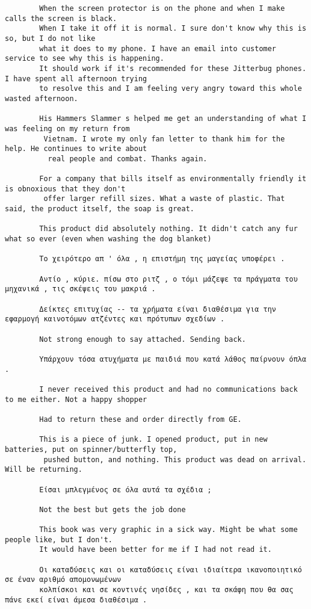 \documentclass[11pt, a4paper]{article}
\begin{document}
\begin{verbatim}
		When the screen protector is on the phone and when I make calls the screen is black. 
		When I take it off it is normal. I sure don't know why this is so, but I do not like 
		what it does to my phone. I have an email into customer service to see why this is happening. 
		It should work if it's recommended for these Jitterbug phones. I have spent all afternoon trying 
		to resolve this and I am feeling very angry toward this whole wasted afternoon.
		
		His Hammers Slammer s helped me get an understanding of what I was feeling on my return from
		 Vietnam. I wrote my only fan letter to thank him for the help. He continues to write about
		  real people and combat. Thanks again.
		
		For a company that bills itself as environmentally friendly it is obnoxious that they don't
		 offer larger refill sizes. What a waste of plastic. That said, the product itself, the soap is great.
		
		This product did absolutely nothing. It didn't catch any fur what so ever (even when washing the dog blanket)
		
		Το χειρότερο απ ' όλα , η επιστήμη της μαγείας υποφέρει .
		
		Αντίο , κύριε. πίσω στο ριτζ , ο τόμι μάζεψε τα πράγματα του μηχανικά , τις σκέψεις του μακριά .
		
		Δείκτες επιτυχίας -- τα χρήματα είναι διαθέσιμα για την εφαρμογή καινοτόμων ατζέντες και πρότυπων σχεδίων .
		
		Not strong enough to say attached. Sending back.
		
		Υπάρχουν τόσα ατυχήματα με παιδιά που κατά λάθος παίρνουν όπλα .
		
		I never received this product and had no communications back to me either. Not a happy shopper
		
		Had to return these and order directly from GE.
		
		This is a piece of junk. I opened product, put in new batteries, put on spinner/butterfly top,
		 pushed button, and nothing. This product was dead on arrival. Will be returning.
		
		Είσαι μπλεγμένος σε όλα αυτά τα σχέδια ;
		
		Not the best but gets the job done
		
		This book was very graphic in a sick way. Might be what some people like, but I don't. 
		It would have been better for me if I had not read it.
		
		Οι καταδύσεις και οι καταδύσεις είναι ιδιαίτερα ικανοποιητικό σε έναν αριθμό απομονωμένων 
		κολπίσκοι και σε κοντινές νησίδες , και τα σκάφη που θα σας πάνε εκεί είναι άμεσα διαθέσιμα .
		

\end{verbatim}
\end{document}
